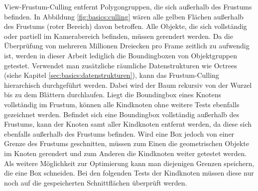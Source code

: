 View-Frustum-Culling entfernt Polygongruppen, die sich außerhalb des Frustums befinden. In Abbildung \ref{fig:basics:culling} wären alle gelben Flächen außerhalb des Frustums (roter Bereich) davon betroffen. Alle Objekte, die sich vollständig oder partiell im Kamerabereich befinden, müssen gerendert werden. Da die Überprüfung von mehreren Millionen Dreiecken pro Frame zeitlich zu aufwendig ist, werden in dieser Arbeit lediglich die Boundingboxen von Objektgruppen getestet. Verwendet man zusätzliche räumliche Datenstrukturen wie Octrees (siehe Kapitel \ref{sec:basics:datenstrukturen}), kann das Frustum-Culling hierarchisch durchgeführt werden. Dabei wird der Baum rekursiv von der Wurzel bis zu dem Blättern durchlaufen. Liegt die Boundingbox eines Knotens vollständig im Frustum, können alle Kindknoten ohne weitere Tests ebenfalls gezeichnet werden. Befindet sich eine Boundingbox vollständig außerhalb des Frustums, kann der Knoten samt aller Kindknoten entfernt werden, da diese sich ebenfalls außerhalb des Frustums befinden. Wird eine Box jedoch von einer Grenze des Frustums geschnitten, müssen zum Einen die geometrischen Objekte im Knoten gerendert und zum Anderen die Kindknoten weiter getestet werden. Als weitere Möglichkeit zur Optimierung kann man diejenigen Grenzen speichern, die eine Box schneiden. Bei den folgenden Tests der Kindknoten müssen diese nur noch auf die gespeicherten Schnittflächen überprüft werden.


